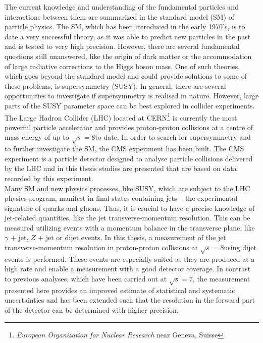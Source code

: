 The current knowledge and understanding of the fundamental particles and interactions between them are summarized in the standard model (SM) of particle physics. The SM, which has been introduced in the early 1970's, is to date a very successful theory, as it was able to predict new particles in the past and is tested to very high precision. However, there are several fundamental questions still unanswered, like the origin of dark matter or the accommodation of large radiative corrections to the Higgs boson mass. One of such theories, which goes beyond the standard model and could provide solutions to some of these problems, is supersymmetry (SUSY). In general, there are several opportunities to investigate if supersymmetry is realised in nature. However, large parts of the SUSY parameter space can be best explored in collider experiments. \\
The Large Hadron Collider (LHC) located at CERN\footnote{\textit{European Organization for Nuclear Research} near Geneva, Suisse} is currently the most powerful particle accelerator and provides proton-proton collisions at a centre of mass energy of up to $\sqrt{s} = 8$\tev to date. In order to search for supersymmetry and to further investigate the SM, the CMS experiment has been built. The CMS experiment is a particle detector designed to analyse particle collisions delivered by the LHC and in this thesis studies are presented that are based on data recorded by this experiment. \\ 
Many SM and new physics processes, like SUSY, which are subject to the LHC physics program, manifest in final states containing jets -- the experimental signature of quarks and gluons. Thus, it is crucial to have a precise knowledge of jet-related quantities, like the jet transverse-momentum resolution. This can be measured utilizing events with a momentum balance in the transverse plane, like $\gamma$ + jet, $Z$ + jet or dijet events. In this thesis, a measurement of the jet transverse-momentum resolution in proton-proton collisions at $\sqrt{s} = 8$\tev using dijet events is performed. These events are especially suited as they are produced at a high rate and enable a measurement with a good detector coverage. In contrast to previous analyses, which have been carried out at $\sqrt{s} = 7$\tev, the measurement presented here provides an improved estimate of statistical and systematic uncertainties and has been extended such that the resolution in the forward part of the detector can be determined with higher precision. \\
